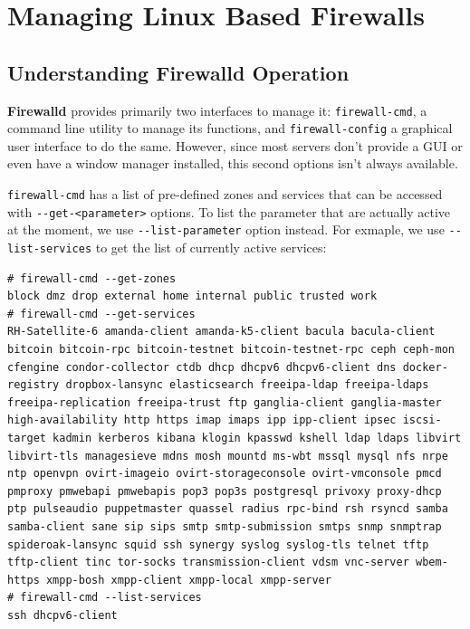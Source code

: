 \chapter{Managing Linux Based Firewalls}
	
\section{Understanding Firewalld Operation}
\textbf{Firewalld} provides primarily two interfaces to manage it: \verb|firewall-cmd|, a command line utility to manage its functions, and \verb|firewall-config| a graphical user interface to do the same. However, since most servers don't provide a GUI or even have a window manager installed, this second options isn't always available.

\verb|firewall-cmd| has a list of pre-defined zones and services that can be accessed with \verb|--get-<parameter>| options. To list the parameter that are actually active at the moment, we use \verb|--list-parameter| option instead. For exmaple, we use \verb|--list-services| to get the list of currently active services:

\vspace{-15pt}
\begin{verbatim}
# firewall-cmd --get-zones
block dmz drop external home internal public trusted work
# firewall-cmd --get-services
RH-Satellite-6 amanda-client amanda-k5-client bacula bacula-client bitcoin bitcoin-rpc bitcoin-testnet bitcoin-testnet-rpc ceph ceph-mon cfengine condor-collector ctdb dhcp dhcpv6 dhcpv6-client dns docker-registry dropbox-lansync elasticsearch freeipa-ldap freeipa-ldaps freeipa-replication freeipa-trust ftp ganglia-client ganglia-master high-availability http https imap imaps ipp ipp-client ipsec iscsi-target kadmin kerberos kibana klogin kpasswd kshell ldap ldaps libvirt libvirt-tls managesieve mdns mosh mountd ms-wbt mssql mysql nfs nrpe ntp openvpn ovirt-imageio ovirt-storageconsole ovirt-vmconsole pmcd pmproxy pmwebapi pmwebapis pop3 pop3s postgresql privoxy proxy-dhcp ptp pulseaudio puppetmaster quassel radius rpc-bind rsh rsyncd samba samba-client sane sip sips smtp smtp-submission smtps snmp snmptrap spideroak-lansync squid ssh synergy syslog syslog-tls telnet tftp tftp-client tinc tor-socks transmission-client vdsm vnc-server wbem-https xmpp-bosh xmpp-client xmpp-local xmpp-server
# firewall-cmd --list-services 
ssh dhcpv6-client
\end{verbatim}
\vspace{-10pt}	

